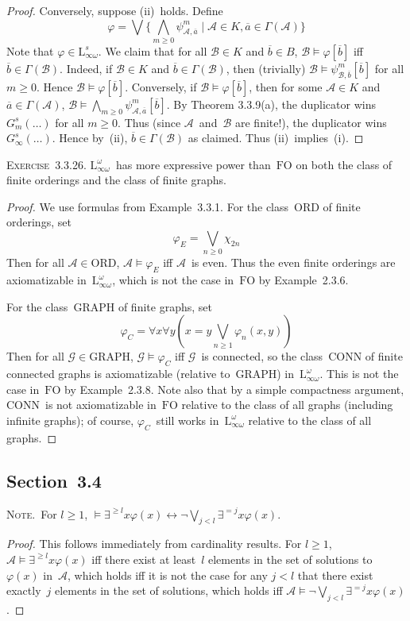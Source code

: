 \documentclass[letterpaper]{article}
\newcommand{\A}{\mathcal{A}}
\newcommand{\B}{\mathcal{B}}
\newcommand{\G}{\mathcal{G}}
\newcommand{\fo}{\mathrm{FO}}
\renewcommand{\L}{\mathrm{L}}
\newcommand{\Lio}{\L_{\infty\omega}}
\newcommand{\Lioo}{\Lio^{\omega}}
\newcommand{\ord}{\mathrm{ORD}}
\newcommand{\graph}{\mathrm{GRAPH}}
\newcommand{\conn}{\mathrm{CONN}}
\newcommand{\obar}[1]{\overline{#1}}
\newcommand{\liff}{\leftrightarrow}
\newcommand{\biglor}{\bigvee}
\newcommand{\bigland}{\bigwedge}
\newcommand{\ege}[1]{\exists^{\ge{#1}}}
\newcommand{\eeq}[1]{\exists^{={#1}}}
\newcommand{\booksection}[1]{\subsection*{Section~{#1}}}
\newcommand{\exercise}[1]{\noindent\textsc{Exercise~{#1}.}}
\newcommand{\note}{\noindent\textsc{Note.}\ }
\theoremstyle{plain}
\begin{document}
\begin{enumerate}
\begin{proof}
Conversely, suppose (ii)~holds. Define
$$\varphi=\biglor\{\bigland_{m\ge0}\psi_{\A,\obar{a}}^m\mid\A\in K,\obar{a}\in\Gamma(\A)\}$$
Note that $\varphi\in\Lio^s$. We claim that for all $\B\in K$ and $\obar{b}\in B$, $\B\models\varphi[\obar{b}]$ iff $\obar{b}\in\Gamma(\B)$. Indeed, if $\B\in K$ and $\obar{b}\in\Gamma(\B)$, then (trivially) $\B\models\psi_{\B,\obar{b}}^m[\obar{b}]$ for all $m\ge0$. Hence $\B\models\varphi[\obar{b}]$. Conversely, if $\B\models\varphi[\obar{b}]$, then for some $\A\in K$ and $\obar{a}\in\Gamma(\A)$, $\B\models\bigland_{m\ge0}\psi_{\A,\obar{a}}^m[\obar{b}]$. By Theorem 3.3.9(a), the duplicator wins~$G_m^s(\ldots)$ for all $m\ge0$. Thus (since $\A$~and~$\B$ are finite!), the duplicator wins~$G_{\infty}^s(\ldots)$. Hence by~(ii), $\obar{b}\in\Gamma(\B)$ as claimed. Thus (ii)~implies~(i).
\end{proof}
\end{enumerate}

\exercise{3.3.26}
$\Lioo$~has more expressive power than~$\fo$ on both the class of finite orderings and the class of finite graphs.
\begin{proof}
We use formulas from Example~3.3.1. For the class~$\ord$ of finite orderings, set
$$\varphi_E=\biglor_{n\ge0}\chi_{2n}$$
Then for all $\A\in\ord$, $\A\models\varphi_E$ iff $\A$~is even. Thus the even finite orderings are axiomatizable in~$\Lioo$, which is not the case in~$\fo$ by Example~2.3.6.

For the class~$\graph$ of finite graphs, set
$$\varphi_C=\forall x\forall y(x=y\biglor_{n\ge1}\varphi_n(x,y))$$
Then for all $\G\in\graph$, $\G\models\varphi_C$ iff $\G$~is connected, so the class~$\conn$ of finite connected graphs is axiomatizable (relative to~$\graph$) in~$\Lioo$. This is not the case in~$\fo$ by Example~2.3.8. Note also that by a simple compactness argument, $\conn$~is not axiomatizable in~$\fo$ relative to the class of all graphs (including infinite graphs); of course, $\varphi_C$~still works in~$\Lioo$ relative to the class of all graphs.
\end{proof}

\booksection{3.4}
\note For $l\ge 1$, $\models\ege{l}x\varphi(x)\liff\lnot\biglor_{j<l}\eeq{j}x\varphi(x)$.
\begin{proof}
This follows immediately from cardinality results. For $l\ge 1$, $\A\models\ege{l}x\varphi(x)$ iff there exist at least~$l$ elements in the set of solutions to~$\varphi(x)$ in~$\A$, which holds iff it is not the case for any $j<l$ that there exist exactly~$j$ elements in the set of solutions, which holds iff $\A\models\lnot\biglor_{j<l}\eeq{j}x\varphi(x)$.
\end{proof}
\end{document}
